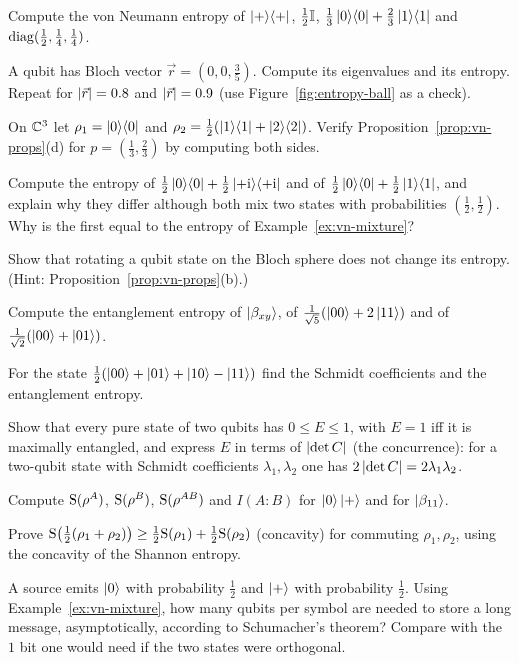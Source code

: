 \begin{exerciseset}
   Compute the von Neumann entropy of $\left|+\right\rangle\!\left\langle+\right|$, $\tfrac12\mathbb{I}$, $\tfrac13\left|0\right\rangle\!\left\langle0\right|+\tfrac23\left|1\right\rangle\!\left\langle1\right|$ and $\operatorname{diag}(\tfrac12,\tfrac14,\tfrac14)$.

   A qubit has Bloch vector $\vec r=(0,0,\tfrac35)$. Compute its eigenvalues and its entropy. Repeat for $\left|\vec r\right|=0.8$ and $\left|\vec r\right|=0.9$ (use Figure~\ref{fig:entropy-ball} as a check).

   On $\mathbb{C}^3$ let $\rho_1=\left|0\right\rangle\!\left\langle0\right|$ and $\rho_2=\tfrac12(\left|1\right\rangle\!\left\langle1\right|+\left|2\right\rangle\!\left\langle2\right|)$. Verify Proposition~\ref{prop:vn-props}(d) for $p=(\tfrac13,\tfrac23)$ by computing both sides.

   Compute the entropy of $\tfrac12\left|0\right\rangle\!\left\langle0\right|+\tfrac12\left|+\mathrm{i}\right\rangle\!\left\langle+\mathrm{i}\right|$ and of $\tfrac12\left|0\right\rangle\!\left\langle0\right|+\tfrac12\left|1\right\rangle\!\left\langle1\right|$, and explain why they differ although both mix two states with probabilities $(\tfrac12,\tfrac12)$. Why is the first equal to the entropy of Example~\ref{ex:vn-mixture}?

   Show that rotating a qubit state on the Bloch sphere does not change its entropy. (Hint: Proposition~\ref{prop:vn-props}(b).)

   Compute the entanglement entropy of $\left|\beta_{xy}\right\rangle$, of $\tfrac1{\sqrt5}(\left|00\right\rangle+2\left|11\right\rangle)$ and of $\frac1{\sqrt2}(\left|00\right\rangle+\left|01\right\rangle)$.

   For the state $\frac12(\left|00\right\rangle+\left|01\right\rangle+\left|10\right\rangle-\left|11\right\rangle)$ find the Schmidt coefficients and the entanglement entropy.

   Show that every pure state of two qubits has $0\le E\le1$, with $E=1$ iff it is maximally entangled, and express $E$ in terms of $\left|\det C\right|$ (the concurrence): for a two-qubit state with Schmidt coefficients $\lambda_1,\lambda_2$ one has $2\left|\det C\right|=2\lambda_1\lambda_2$.

   Compute $\mathrm{S}(\rho^A)$, $\mathrm{S}(\rho^B)$, $\mathrm{S}(\rho^{AB})$ and $I(A\!:\!B)$ for $\left|0\right\rangle\left|+\right\rangle$ and for $\left|\beta_{11}\right\rangle$.

   Prove $\mathrm{S}\bigl(\tfrac12(\rho_1+\rho_2)\bigr)\ge\tfrac12\mathrm{S}(\rho_1)+\tfrac12\mathrm{S}(\rho_2)$ (concavity) for commuting $\rho_1,\rho_2$, using the concavity of the Shannon entropy.

   A source emits $\left|0\right\rangle$ with probability $\tfrac12$ and $\left|+\right\rangle$ with probability $\tfrac12$. Using Example~\ref{ex:vn-mixture}, how many qubits per symbol are needed to store a long message, asymptotically, according to Schumacher's theorem? Compare with the $1$ bit one would need if the two states were orthogonal.
\end{exerciseset}
